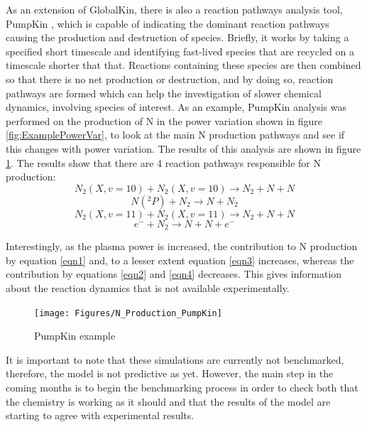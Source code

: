 \documentclass[11pt, oneside]{article}   	%
\begin{document}
As an extension of GlobalKin, there is also a reaction pathways analysis tool, PumpKin \cite{Markosyan2014pumpkin}, which is capable of indicating the dominant reaction pathways causing the production and destruction of species.
Briefly, it works by taking a specified short timescale and identifying fast-lived species that are recycled on a timescale shorter that that.
Reactions containing these species are then combined so that there is no net production or destruction, and by doing so, reaction pathways are formed which can help the investigation of slower chemical dynamics, involving species of interest.
As an example, PumpKin analysis was performed on the production of N in the power variation shown in figure \ref{fig:ExamplePowerVar}, to look at the main N production pathways and see if this changes with power variation.
The results of this analysis are shown in figure \ref{fig:pumpkin}.
The results show that there are 4 reaction pathways responsible for N production:
\begin{equation}
N_2(X, v=10) + N_2(X, v=10) \rightarrow N_2 + N + N
\label{eqn1}
\end{equation}
\begin{equation}
N(^2P) + N_2 \rightarrow N + N_2
\label{eqn2}
\end{equation}
\begin{equation}
N_2(X, v=11) + N_2(X, v=11) \rightarrow N_2 + N + N
\label{eqn3}
\end{equation}
\begin{equation}
e^- + N_2 \rightarrow  N + N + e^-
\label{eqn4}
\end{equation}

Interestingly, as the plasma power is increased, the contribution to N production by equation \ref{eqn1} and, to a lesser extent equation \ref{eqn3} increases, whereas the contribution by equations \ref{eqn2} and \ref{eqn4} decreases.
This gives information about the reaction dynamics that is not available experimentally.


\begin{figure}
\texttt{[image: Figures/N\_Production\_PumpKin]}
\label{fig:pumpkin}
\caption{PumpKin example}
\end{figure}

It is important to note that these simulations are currently not benchmarked, therefore, the model is not predictive as yet.
However, the main step in the coming months is to begin the benchmarking process in order to check both that the chemistry is working as it should and that the results of the model are starting to agree with experimental results.
\end{document}
